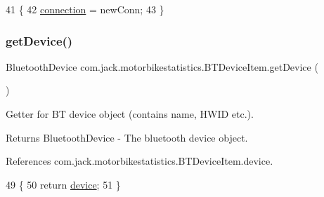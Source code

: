 \begin{DoxyCode}
41                                                     \{
42         \hyperlink{classcom_1_1jack_1_1motorbikestatistics_1_1_b_t_device_item_a38830528ad49afd7ba09ced7ab55d6dc}{connection} = newConn;
43     \}
\end{DoxyCode}
\mbox{\label{classcom_1_1jack_1_1motorbikestatistics_1_1_b_t_device_item_aab406fd517db729f7803d48546fd1a95}} 
\subsubsection{\texorpdfstring{get\+Device()}{getDevice()}}
{\footnotesize\ttfamily Bluetooth\+Device com.\+jack.\+motorbikestatistics.\+B\+T\+Device\+Item.\+get\+Device (\begin{DoxyParamCaption}{ }\end{DoxyParamCaption})\hspace{0.3cm}{\ttfamily [inline]}}



Getter for BT device object (contains name, H\+W\+ID etc.). 

\begin{DoxyReturn}{Returns}
Bluetooth\+Device -\/ The bluetooth device object. 
\end{DoxyReturn}


References com.\+jack.\+motorbikestatistics.\+B\+T\+Device\+Item.\+device.


\begin{DoxyCode}
49                                        \{
50         \textcolor{keywordflow}{return} \hyperlink{classcom_1_1jack_1_1motorbikestatistics_1_1_b_t_device_item_acd943b008d77dcb5d72f8a65fa4986b9}{device};
51     \}
\end{DoxyCode}
\mbox{\label{classcom_1_1jack_1_1motorbikestatistics_1_1_b_t_device_item_aee33189f94c2a428ac67301b536dd004}} 
